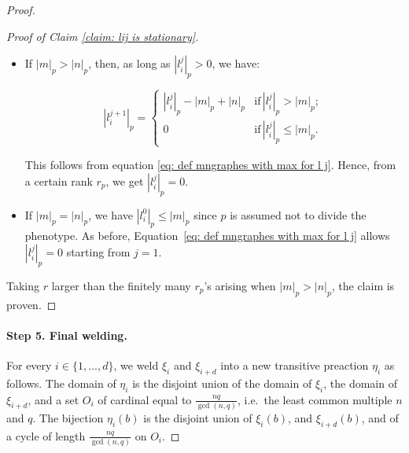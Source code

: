 \documentclass[12pt]{article}
\numberwithin{equation}{section}
\theoremstyle{definition}
\newenvironment{cproofbis}[1]{\begin{proof}[#1]\renewcommand*{\qedsymbol}{\(\square_\text{claim}\)}}{\end{proof}}
\newcommand{\abs}[1]{\left\lvert #1\right\rvert}
\begin{document}
\begin{proof}
\begin{cproofbis}{Proof of Claim \ref{claim: lij is stationary}}
\begin{itemize}
			
			\item If $\vert m\vert _p>\vert n\vert_p$, then, as long as $\abs{l_i^j}_p > 0$, we have:
			
			\[
			\abs{l_i^{j+1}}_p = 
			\begin{cases}
				\abs{l_i^j}_p - \abs{m}_p + \abs{n}_p & \text{if} \, \abs{l_i^j}_p > \abs{m}_p; \\
				0 & \text{if} \, \abs{l_i^j}_p \leq \abs{m}_p.
			\end{cases}
			\]
			
			This follows from equation \eqref{eq: def mngraphes with max for l j}.
			Hence, from a certain rank $r_p$, we get $\abs{l_i^j}_p = 0$.
			
			\item If $\vert m\vert _p=\vert n\vert_p$, we have $\abs{l_i^0}_p \leq \abs{m}_p$ since $p$ is assumed not to divide the phenotype. As before, Equation~\eqref{eq: def mngraphes with max for l j} allows $\abs{l_i^j}_p = 0$ starting from $j = 1$.
			
		\end{itemize}
		Taking $r$ larger than the finitely many $r_p$'s arising when $\vert m\vert _p>\vert n\vert_p$, the claim is proven.
	\end{cproofbis} 
	
	
	
	
	
	\paragraph{Step 5. Final welding.}
	
	For every $i\in\{1,...,d\}$, we weld $\xi_i$ and $\xi_{i+d}$ into a new transitive preaction $\eta_i$ as follows.
	The domain of $\eta_i$ is the disjoint union of the domain of $\xi_i$, the domain of $\xi_{i+d}$, 
	and a set $O_i$ of cardinal equal to $\frac{nq}{\gcd(n,q)}$, i.e.\ the least common multiple $n$ and $q$. 
	The bijection $\eta_i(b)$ is the disjoint union of $\xi_i(b)$, and $\xi_{i+d}(b)$, and of a cycle of length $\frac{nq}{\gcd(n,q)}$ on $O_i$.
	

\end{proof}
\end{document}
